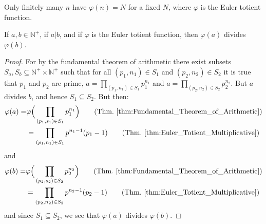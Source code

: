 \documentclass{article}                                                        %
\begin{document}
            Only finitely many $n$ have $\varphi(n)=N$ for a fixed $N$, where
            $\varphi$ is the Euler totient function.
            \begin{theorem}
                \label{thm:A_DIV_B_then_EulerTotA_Div_EulerTotB}%
                If $a,b\in\mathbb{N}^{+}$, if $a|b$, and if $\varphi$ is the Euler
                totient function, then $\varphi(a)$ divides $\varphi(b)$.
            \end{theorem}
            \begin{proof}
                For by the fundamental theorem of arithmetic there exist subsets
                $S_{a},S_{b}\subseteq\mathbb{N}^{+}\times\mathbb{N}^{+}$ such that
                for all $(p_{1},n_{1})\in{S}_{1}$ and $(p_{2},n_{2})\in{S}_{2}$ it
                is true that $p_{1}$ and $p_{2}$ are prime,
                $a=\prod_{(p_{1},n_{1})\in{S}_{1}}p_{1}^{n_{1}}$ and
                $a=\prod_{(p_{2},n_{2})\in{S}_{2}}p_{2}^{n_{2}}$. But $a$ divides
                $b$, and hence $S_{1}\subseteq{S}_{2}$. But then:
                \begin{align*}
                    \varphi(a)=&\varphi\Big(
                        \prod_{(p_{1},s_{1})\in{S}_{1}}p_{1}^{n_{1}}
                    \Big)\tag{Thm.~\ref{thm:Fundamental_Theorem_of_Arithmetic}}\\
                    &=\prod_{(p_{1},n_{1})\in{S}_{1}}p^{n_{1}-1}(p_{1}-1)
                    \tag{Thm.~\ref{thm:Euler_Totient_Multiplicative}}
                \end{align*}
                and
                \begin{align*}
                    \varphi(b)=&\varphi\Big(
                        \prod_{(p_{2},s_{2})\in{S}_{2}}p_{2}^{n_{2}}
                    \Big)\tag{Thm.~\ref{thm:Fundamental_Theorem_of_Arithmetic}}\\
                    &=\prod_{(p_{2},n_{2})\in{S}_{2}}p^{n_{2}-1}(p_{2}-1)
                    \tag{Thm.~\ref{thm:Euler_Totient_Multiplicative}}
                \end{align*}
                and since $S_{1}\subseteq{S}_{2}$, we see that
                $\varphi(a)$ divides $\varphi(b)$.
            \end{proof}
\end{document}
